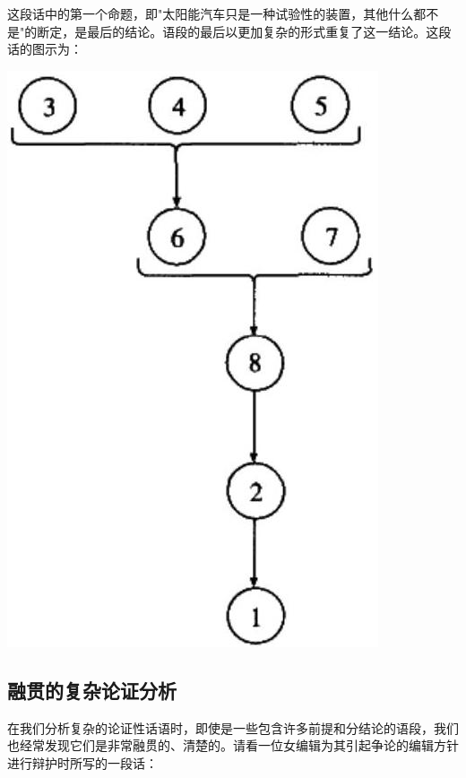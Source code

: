 这段话中的第一个命题，即"太阳能汽车只是一种试验性的装置，其他什么都不是"的断定，是最后的结论。语段的最后以更加复杂的形式重复了这一结论。这段话的图示为：

\begin{center}
\includegraphics[width=\textwidth]{images/2025_05_15_6a28331d5e7c993ad07ag-074.jpg}
\end{center}

\subsection{融贯的复杂论证分析}

在我们分析复杂的论证性话语时，即使是一些包含许多前提和分结论的语段，我们也经常发现它们是非常融贯的、清楚的。请看一位女编辑为其引起争论的编辑方针进行辩护时所写的一段话：

